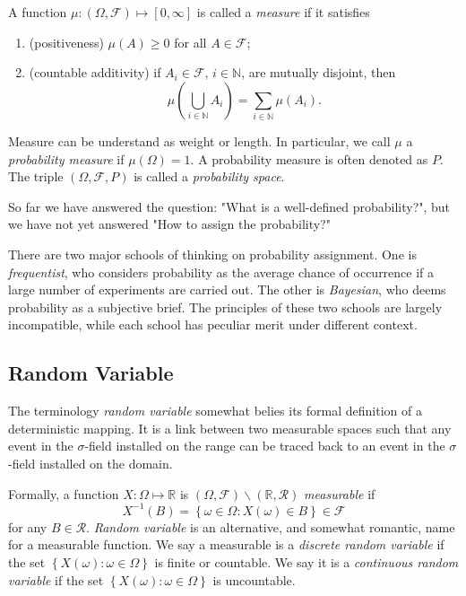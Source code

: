 \documentclass[11pt]{article}
\providecommand{\tightlist}{%
      \setlength{\itemsep}{0pt}\setlength{\parskip}{0pt}}
\begin{document}
A function \(\mu:(\Omega, \mathcal{F})\mapsto\left[0,\infty\right]\) is
called a \emph{measure} if it satisfies

\begin{enumerate}
\def\labelenumi{\arabic{enumi}.}
\tightlist
\item
  (positiveness) \(\mu\left(A\right)\geq 0\) for all
  \(A\in\mathcal{F}\);
\item
  (countable additivity) if \(A_{i}\in\mathcal{F}\), \(i\in\mathbb{N}\),
  are mutually disjoint, then
  \[\mu\left(\bigcup_{i\in\mathbb{N}}A_{i}\right)=\sum_{i\in\mathbb{N}}\mu\left(A_{i}\right).\]
\end{enumerate}

Measure can be understand as weight or length. In particular, we call
\(\mu\) a \emph{probability measure} if \(\mu\left(\Omega\right)=1\). A
probability measure is often denoted as \(P\). The triple
\(\left(\Omega,\mathcal{F},P\right)\) is called a \emph{probability
space}.

So far we have answered the question: "What is a well-defined
probability?", but we have not yet answered "How to assign the
probability?"

There are two major schools of thinking on probability assignment. One
is \emph{frequentist}, who considers probability as the average chance
of occurrence if a large number of experiments are carried out. The
other is \emph{Bayesian}, who deems probability as a subjective brief.
The principles of these two schools are largely incompatible, while each
school has peculiar merit under different context.

    \subsection{Random Variable}\label{random-variable}

The terminology \emph{random variable} somewhat belies its formal
definition of a deterministic mapping. It is a link between two
measurable spaces such that any event in the \(\sigma\)-field installed
on the range can be traced back to an event in the \(\sigma\)-field
installed on the domain.

Formally, a function \(X:\Omega\mapsto\mathbb{R}\) is
\(\left(\Omega,\mathcal{F}\right)\backslash\left(\mathbb{R},\mathcal{R}\right)\)
\emph{measurable} if
\[X^{-1}\left(B\right)=\left\{ \omega\in\Omega:X\left(\omega\right)\in B\right\} \in\mathcal{F}\]
for any \(B\in\mathcal{R}.\) \emph{Random variable} is an alternative,
and somewhat romantic, name for a measurable function. We say a
measurable is a \emph{discrete random variable} if the set
\(\left\{X\left(\omega\right):\omega\in\Omega\right\}\) is finite or
countable. We say it is a \emph{continuous random variable} if the set
\(\left\{ X\left(\omega\right):\omega\in\Omega\right\}\) is uncountable.
\end{document}
